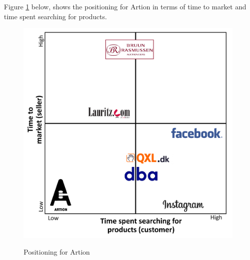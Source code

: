 Figure \ref{PositioningMapFigure} below, shows the positioning for Artion in terms of time to market and time spent searching for products.

\begin{figure}[H]
    \centering
\caption{Positioning for Artion}
\includegraphics[width=14cm]{Appendix/PositioningMapV2.png}
\label{PositioningMapFigure}
\end{figure}
